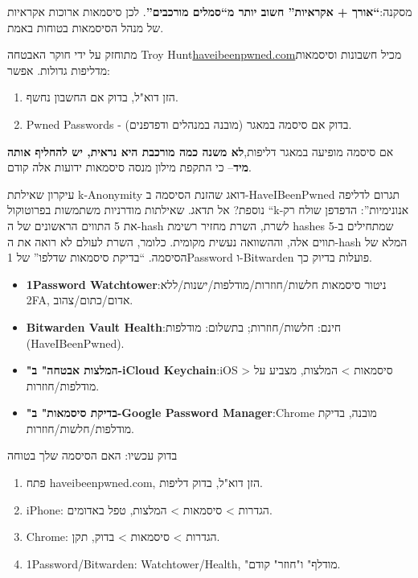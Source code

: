 מסקנה:\textbf{“אורך + אקראיות” חשוב יותר מ“סמלים מורכבים”}. לכן סיסמאות ארוכות אקראיות של מנהל הסיסמאות בטוחות באמת.


מתוחזק על ידי חוקר האבטחה Troy Hunt\href{https://haveibeenpwned.com}{haveibeenpwned.com}מכיל חשבונות וסיסמאות מדליפות גדולות. אפשר:

\begin{enumerate}
  \item הזן דוא"ל, בדוק אם החשבון נחשף.
  \item Pwned Passwords - בדוק אם סיסמה במאגר (מובנה במנהלים ודפדפנים).
\end{enumerate}

אם סיסמה מופיעה במאגר דליפות,\textbf{לא משנה כמה מורכבת היא נראית, יש להחליף אותה מיד}– כי התקפת מילון מנסה סיסמאות ידועות אלה קודם.

\begin{tcbinfo}{עיקרון שאילתת k-Anonymity}
דואג שהזנת הסיסמה ב-HaveIBeenPwned תגרום לדליפה נוספת? אל תדאג. שאילתות מודרניות משתמשות בפרוטוקול “k-אנונימיות”: הדפדפן שולח רק את 5 התווים הראשונים של ה-hash לשרת, השרת מחזיר רשימת hashes שמתחילים ב-5 תווים אלה, וההשוואה נעשית מקומית. כלומר, השרת לעולם לא רואה את ה-hash המלא של הסיסמה. “בדיקת סיסמאות שדלפו” של 1Password ו-Bitwarden פועלות בדיוק כך.

\end{tcbinfo}


\begin{itemize}
  \item \textbf{1Password Watchtower}:ניטור סיסמאות חלשות/חוזרות/מודלפות/ישנות/ללא 2FA, אדום/כתום/צהוב.
  \item \textbf{Bitwarden Vault Health}:חינם: חלשות/חוזרות; בתשלום: מודלפות (HaveIBeenPwned).
  \item \textbf{"המלצות אבטחה" ב-iCloud Keychain}:iOS > סיסמאות > המלצות, מצביע על מודלפות/חוזרות.
  \item \textbf{"בדיקת סיסמאות" ב-Google Password Manager}:Chrome מובנה, בדיקת מודלפות/חלשות/חוזרות.
\end{itemize}

\begin{tcbpractice}{בדוק עכשיו: האם הסיסמה שלך בטוחה}
\begin{enumerate}
  \item פתח haveibeenpwned.com, הזן דוא"ל, בדוק דליפות.
  \item iPhone: הגדרות > סיסמאות > המלצות, טפל באדומים.
  \item Chrome: הגדרות > סיסמאות > בדוק, תקן.
  \item 1Password/Bitwarden: Watchtower/Health, "מודלף" ו"חוזר" קודם.
\end{enumerate}

\end{tcbpractice}

